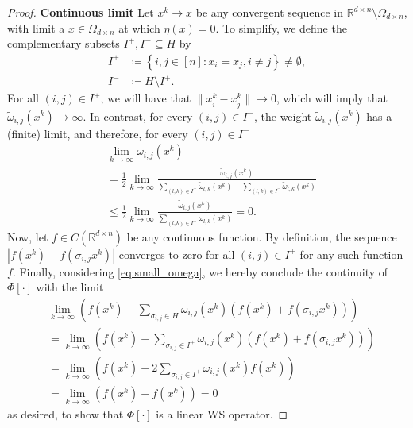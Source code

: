\documentclass{amsart}
\theoremstyle{plain}
\theoremstyle{definition}
\theoremstyle{remark}
\newcommand{\RR}{\mathbb{R}}
\newcommand{\abs}[1]{\left\lvert#1\right\rvert}
\begin{document}
\begin{proof}
	\textbf{Continuous limit}
    Let $x^k \to x$ be any convergent sequence in $\RR^{d \times n} \setminus{\Omega_{d \times n}}$, with limit a $x \in \Omega_{d \times n}$ at which $\eta(x) = 0$. 
    To simplify, we define the complementary subsets $I^+ ,I^- \subseteq H$ by
    \begin{equation}
    \begin{split}
        I^+ &\coloneq \left\{i, j \in [n]: x_i = x_j, i \ne j \right\} \ne \emptyset, \\
        I^- &\coloneq H \setminus{I^+}.
    \end{split}
    \end{equation}
For all $(i,j)\in I^+$, we will have that $\|x_i^k-x_j^k\| \rightarrow 0 $, which will imply that $\tilde\omega_{i,j}(x^k)\rightarrow \infty $. In contrast, for every $(i, j) \in I^-$, the weight $ \tilde\omega_{i,j}(x^k) $ has a (finite) limit, and therefore, for every $(i, j) \in I^-$
\begin{equation}\label{eq:small_omega}
\begin{split}
    &\lim_{k \to \infty}{\omega_{i,j}(x^k)} \\  &= 
 \frac{1}{2} \lim_{k \to \infty}{
\frac{\tilde{\omega}_{i,j}(x^k)}{\sum_{(l, k) \in I^+}{\tilde{\omega}_{l,k}(x^k)}  + \sum_{(l, k) \in I^-}{\tilde{\omega}_{l,k}(x^k)}
} 
} \\ &\leq
 \frac{1}{2} \lim_{k \to \infty}{
\frac{\tilde{\omega}_{i,j}(x^k)}{\sum_{(l, k) \in I^+}{\tilde{\omega}_{l,k}(x^k)}
} 
} = 0.
\end{split}
\end{equation}
Now, let $f \in C(\RR^{d \times n})$ be any continuous function. By definition, the sequence $\abs{f(x^k) - f(\sigma_{i, j} x^k)}$ converges to zero for all $(i, j) \in I^+$ for any such function $f$. Finally, considering \eqref{eq:small_omega}, we hereby conclude the continuity of $\Phi[\cdot]$ with the limit
\begin{equation}
\begin{split}
     &\lim_{k \to \infty}{\left(
f(x^k) - \sum_{\sigma_{i,j} \in H}{\omega_{i,j}(x^k)\left(f(x^k) + f(\sigma_{i, j} x^k) \right)}
\right)} \\ &= 
\lim_{k \to \infty}{\left(
f(x^k) - \sum_{\sigma_{i,j} \in I^+}{\omega_{i,j}(x^k)\left(f(x^k) + f(\sigma_{i, j} x^k) \right)}
\right)}
\\ &= 
\lim_{k \to \infty}{\left(
f(x^k) - 2\sum_{\sigma_{i,j} \in I^+}{\omega_{i,j}(x^k)f(x^k)}
\right)} \\
&= \lim_{k \to \infty}{\left(f(x^k) - f(x^k) \right)} = 0
\end{split}
\end{equation}
as desired, to show that $\Phi[\cdot]$ is a linear WS operator.
\end{proof}
\end{document}
